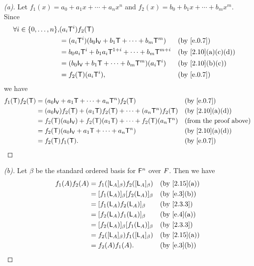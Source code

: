 \begin{proof}[(a)]
	Let \(f_1(x) = a_0 + a_1 x + \cdots + a_n x^n\) and \(f_2(x) = b_0 + b_1 x + \cdots + b_m x^m\).
	Since
	\begin{align*}
		\forall i \in \set{0, \dots, n}, & (a_i \T^i) f_2(\T)                                                                  \\
		                                 & = (a_i \T^i) (b_0 \IT[\V] + b_1 \T + \cdots + b_m \T^m)       &  & \by{e.0.7}       \\
		                                 & = b_0 a_i \T^i + b_1 a_i \T^{1 + i} + \cdots + b_m \T^{m + i} &  & \by{2.10}[a,c,d] \\
		                                 & = (b_0 \IT[\V] + b_1 \T + \cdots + b_m \T^m) (a_i \T^i)       &  & \by{2.10}[b,c]   \\
		                                 & = f_2(\T) (a_i \T^i),                                         &  & \by{e.0.7}
	\end{align*}
	we have
	\begin{align*}
		f_1(\T) f_2(\T) & = (a_0 \IT[\V] + a_1 \T + \cdots + a_n \T^n) f_2(\T)                     &  & \by{e.0.7}                    \\
		                & = (a_0 \IT[\V]) f_2(\T) + (a_1 \T) f_2(\T) + \cdots + (a_n \T^n) f_2(\T) &  & \by{2.10}[a,d]                \\
		                & = f_2(\T) (a_0 \IT[\V]) + f_2(\T) (a_1 \T) + \cdots + f_2(\T) (a_n \T^n) &  & \text{(from the proof above)} \\
		                & = f_2(\T) (a_0 \IT[\V] + a_1 \T + \cdots + a_n \T^n)                     &  & \by{2.10}[a,d]                \\
		                & = f_2(\T) f_1(\T).                                                       &  & \by{e.0.7}
	\end{align*}
\end{proof}

\begin{proof}[(b)]
	Let \(\beta\) be the standard ordered basis for \(\mathsf{F}^n\) over \(\mathit{F}\).
	Then we have
	\begin{align*}
		f_1(A) f_2(A) & = f_1([\L_A]_{\beta}) f_2([\L_A]_{\beta}) &  & \by{2.15}[a] \\
		              & = [f_1(\L_A)]_{\beta} [f_2(\L_A)]_{\beta} &  & \by{e.3}[b]  \\
		              & = [f_1(\L_A) f_2(\L_A)]_{\beta}           &  & \by{2.3.3}   \\
		              & = [f_2(\L_A) f_1(\L_A)]_{\beta}           &  & \by{e.4}[a]  \\
		              & = [f_2(\L_A)]_{\beta} [f_1(\L_A)]_{\beta} &  & \by{2.3.3}   \\
		              & = f_2([\L_A]_{\beta}) f_1([\L_A]_{\beta}) &  & \by{2.15}[a] \\
		              & = f_2(A) f_1(A).                          &  & \by{e.3}[b]
	\end{align*}
\end{proof}

